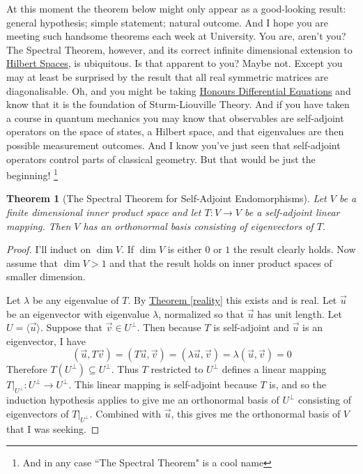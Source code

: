 \documentclass[11pt]{amsbook}
\newtheorem{theorem}{Theorem}[section]
\theoremstyle{definition}
\begin{document}
\noindent
At this moment the theorem below might only appear as a good-looking result: general hypothesis; simple statement; natural outcome. And I hope you are meeting such handsome theorems each week at University. You are, aren't you? The Spectral Theorem, however, and its correct infinite dimensional extension to \href{http://www.drps.ed.ac.uk/14-15/dpt/cxmath10046.htm}{Hilbert Spaces}, is ubiquitous. Is that apparent to you? Maybe not. Except you may at least be surprised by the result that all real symmetric matrices are diagonalisable. Oh, and you might be taking \href{http://www.drps.ed.ac.uk/14-15/dpt/cxmath10066.htm}{Honours Differential Equations} and know that it is the foundation of Sturm-Liouville Theory. And if you have taken a course in quantum mechanics you may know that observables are self-adjoint operators on the space of states, a Hilbert space, and that eigenvalues are then possible measurement outcomes. And I know you've just seen that self-adjoint operators control parts of classical geometry. But that would be just the beginning! \footnote{And in any case ``The Spectral Theorem" is a cool name}

\begin{theorem}[The Spectral Theorem for Self-Adjoint Endomorphisms] \label{spectral} Let $V$ be a finite dimensional inner product space and let $T:V\to V$ be a self-adjoint linear mapping. Then $V$ has an orthonormal basis consisting of eigenvectors of $T$.
\end{theorem}

\begin{proof}
I'll induct on $\dim V$. If $\dim V$ is either $0$ or $1$ the result clearly holds. Now assume that $\dim V >1$ and that the result holds on inner product spaces of smaller dimension.

Let $\lambda$ be any eigenvalue of $T$. By \hyperref[reality]{Theorem \ref{reality}} this exists and is real. Let $\vec{u}$ be an eigenvector with eigenvalue $\lambda$, normalized so that $\vec{u}$ has unit length. Let $U = \langle \vec{u} \rangle$. Suppose that $\vec{v}\in U^{\perp}$. Then because $T$ is self-adjoint and $\vec{u}$ is an eigenvector, I have $$ (\vec{u}, T\vec{v}) = (T\vec{u}, \vec{v}) = (\lambda \vec{u}, \vec{v}) = \lambda (\vec{u}, \vec{v}) = 0$$ Therefore $T(U^{\perp}) \subseteq U^{\perp}$. Thus $T$ restricted to $U^{\perp}$ defines a linear mapping $T|_{U^{\perp}}: U^{\perp} \to U^{\perp}$. This linear mapping is self-adjoint because $T$ is, and so the induction hypothesis applies to give me an orthonormal basis of $U^{\perp}$ consisting of eigenvectors of $T|_{U^{\perp}}$. Combined with $\vec{u}$, this gives me the orthonormal basis of $V$ that I was seeking.
\end{proof}
\end{document}
